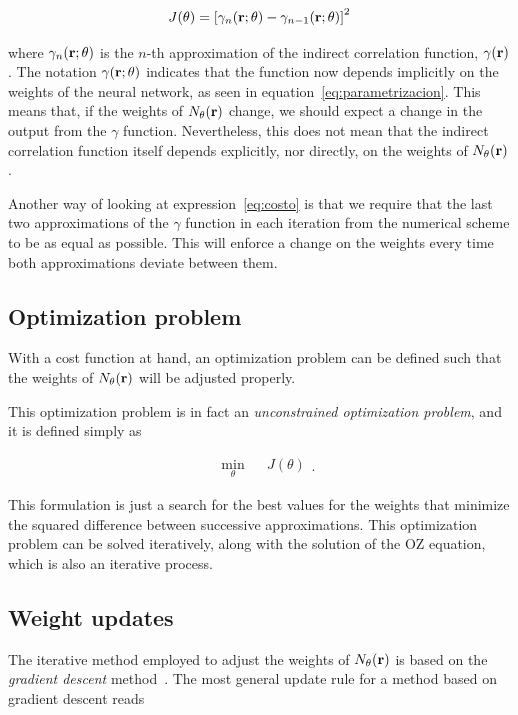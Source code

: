 \begin{equation}
    J(\theta) = \left[\gamma_{n}(\mathbf{r}; \theta) - \gamma_{n-1}(\mathbf{r}; \theta) \right]^2
    \label{eq:costo}
\end{equation}

where $\gamma_{n}(\mathbf{r}; \theta)$ is the $n$-th approximation of the indirect
correlation function, $\gamma(\mathbf{r})$.
The notation $\gamma(\mathbf{r}; \theta)$ indicates that the function now depends implicitly
on the weights of the neural network, as seen in equation~\eqref{eq:parametrizacion}.
This means that, if the weights of $N_{\theta}(\mathbf{r})$ change, we should expect a change in the output
from the $\gamma$ function. Nevertheless, this does not mean that the indirect
correlation function itself depends explicitly, nor directly, on the weights of
$N_{\theta}(\mathbf{r})$.

Another way of looking at expression~\eqref{eq:costo} is that we require that the last 
two approximations of the $\gamma$ function in each iteration from the numerical scheme to 
be as equal as possible. This will enforce a change on the weights every time both 
approximations deviate between them.

\subsection{Optimization problem}
With a cost function at hand, an optimization problem can be defined such that the
weights of $N_{\theta}(\mathbf{r})$ will be adjusted properly.

This optimization problem is in fact an \emph{unconstrained optimization problem},
and it is defined simply as

\begin{equation}
    \begin{aligned}
         & \underset{\theta}{\text{min}}
         & & J(\theta)
    \end{aligned}
    .
    \label{eq:optimizacion}
\end{equation}

This formulation is just a search for the best values for the weights that minimize
the squared difference between successive approximations.
This optimization problem can be solved iteratively, along with the solution of the
OZ equation, which is also an iterative process.

\subsection{Weight updates}
The iterative method employed to adjust the weights of $N_{\theta}(\mathbf{r})$ is based on the
\emph{gradient descent} method~\cite{nocedalNumericalOptimization2006}.
The most general update rule for a method based on gradient descent reads

